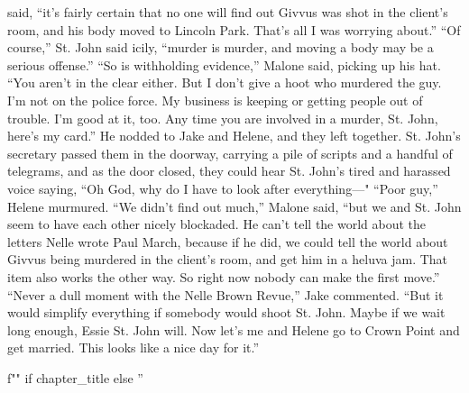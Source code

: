 \documentclass{novel}
\begin{document}
said, “it’s fairly certain that no one will find out Givvus was shot in the client’s room, and his body moved to Lincoln Park. That’s all I was worrying about.” “Of course,” St. John said icily, “murder is murder, and moving a body may be a serious offense.” “So is withholding evidence,” Malone said, picking up his hat. “You aren’t in the clear either. But I don’t give a hoot who murdered the guy. I’m not on the police force. My business is keeping or getting people out of trouble. I’m good at it, too. Any time you are involved in a murder, St. John, here’s my card.” He nodded to Jake and Helene, and they left together. St. John’s secretary passed them in the doorway, carrying a pile of scripts and a handful of telegrams, and as the door closed, they could hear St. John’s tired and harassed voice saying, “Oh God, why do I have to look after everything—" “Poor guy,” Helene murmured. “We didn’t find out much,” Malone said, “but we and St. John seem to have each other nicely blockaded. He can’t tell the world about the letters Nelle wrote Paul March, because if he did, we could tell the world about Givvus being murdered in the client’s room, and get him in a heluva jam. That item also works the other way. So right now nobody can make the first move.” “Never a dull moment with the Nelle Brown Revue,” Jake commented. “But it would simplify everything if somebody would shoot St. John. Maybe if we wait long enough, Essie St. John will. Now let’s me and Helene go to Crown Point and get married. This looks like a nice day for it.”

\begin{ChapterStart}
\vspace{3\nbs}
f"" if chapter_title else ''
\end{ChapterStart}
\end{document}
